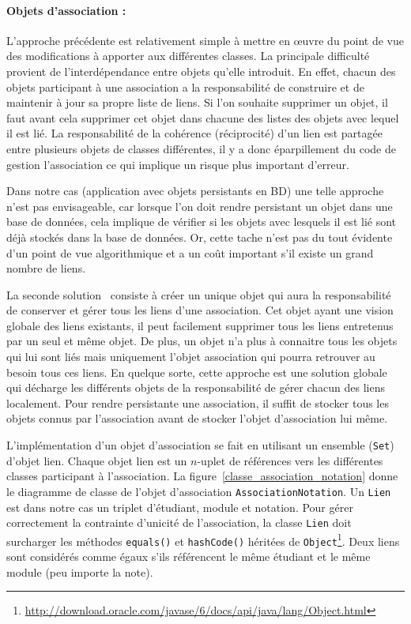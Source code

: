 \documentclass[a4paper,11pt]{article}
\begin{document}
\paragraph{Objets d'association :}
L'approche précédente est relativement simple à mettre en œuvre du point de vue des 
modifications à apporter aux différentes classes. La principale difficulté provient de 
l'interdépendance entre objets qu'elle introduit. 
En effet, chacun des objets participant à une association a la responsabilité de 
construire et de maintenir à jour sa propre liste de liens. Si l'on souhaite supprimer un objet, 
il faut avant cela supprimer cet objet dans chacune des listes des objets avec lequel il 
est lié.  La responsabilité de la cohérence (réciprocité) d'un lien est partagée entre plusieurs 
objets de classes différentes, il y a donc éparpillement du code de gestion l'association ce qui implique 
un risque plus important d'erreur.

Dans notre cas (application avec objets persistants en BD) une telle approche n'est pas envisageable, 
car lorsque l'on doit rendre persistant un objet dans une base de données, cela implique de vérifier si les objets 
avec lesquels il est lié sont déjà stockés dans la base de données. Or, cette tache 
n'est pas du tout évidente d'un point de vue algorithmique et a un coût important s'il 
existe un grand nombre de liens.

La seconde solution~\citep{raool/Gessenharter2009} consiste à créer un unique objet qui aura la responsabilité de conserver 
et gérer tous les liens d'une association. Cet objet ayant une vision globale des liens existants, 
il peut facilement supprimer tous les liens entretenus par un seul et même objet. 
De plus, un objet n'a plus à connaitre tous les objets qui lui sont liés mais uniquement l'objet 
association qui pourra retrouver au besoin tous ces liens. En quelque sorte, cette approche 
est une solution globale qui décharge les différents objets de la responsabilité de gérer chacun 
des liens localement. Pour rendre persistante une association, il suffit de stocker tous les 
objets connus par l'association avant de stocker l'objet d'association lui même.

L'implémentation d'un objet d'association se fait en utilisant un  ensemble (\texttt{Set}) d'objet lien.
Chaque objet lien est un $n$-uplet de références vers les différentes classes participant à l'association.
La figure~\ref{classe_association_notation} donne le diagramme de classe de l'objet d'association \texttt{AssociationNotation}.
Un \texttt{Lien} est dans notre cas un triplet d'étudiant, module et notation. Pour gérer correctement la contrainte d'unicité 
de l'association, la classe \texttt{Lien} doit surcharger les méthodes \texttt{equals()} et \texttt{hashCode()} héritées de 
\texttt{Object}\footnote{\url{http://download.oracle.com/javase/6/docs/api/java/lang/Object.html}}. Deux liens sont 
considérés comme égaux s'ils référencent le même étudiant et le même module (peu importe la note).
\end{document}
